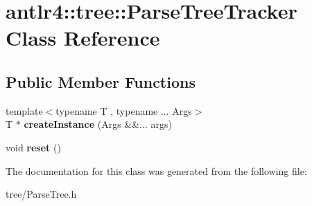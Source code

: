 \hypertarget{classantlr4_1_1tree_1_1ParseTreeTracker}{}\section{antlr4\+:\+:tree\+:\+:Parse\+Tree\+Tracker Class Reference}
\label{classantlr4_1_1tree_1_1ParseTreeTracker}
\subsection*{Public Member Functions}
\begin{DoxyCompactItemize}
\item 
\mbox{\label{classantlr4_1_1tree_1_1ParseTreeTracker_a8dc43fa9e0fc7384d5405c04a5b9f590}} 
{\footnotesize template$<$typename T , typename ... Args$>$ }\\T $\ast$ {\bfseries create\+Instance} (Args \&\&... args)
\item 
\mbox{\label{classantlr4_1_1tree_1_1ParseTreeTracker_a070a249020897abe98fe71622edf1b53}} 
void {\bfseries reset} ()
\end{DoxyCompactItemize}


The documentation for this class was generated from the following file\+:\begin{DoxyCompactItemize}
\item 
tree/Parse\+Tree.\+h\end{DoxyCompactItemize}
